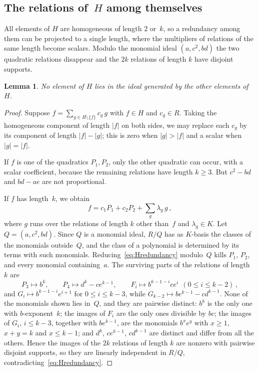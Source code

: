 \documentclass[11pt,letterpaper]{article}
\numberwithin{equation}{section}
\theoremstyle{plain}
\newtheorem{lemma}[theorem]{Lemma}
\theoremstyle{remark}
\newcommand{\len}[1]{\lvert #1\rvert}
\begin{document}
\subsection{The relations of~$H$ among themselves}

All elements of $H$ are homogeneous of length $2$ or~$k$, so a redundancy among them can be projected to a single length, where the multipliers of relations of the same length become scalars. Modulo the monomial ideal $(a,c^2,bd)$ the two quadratic relations disappear and the $2k$ relations of length $k$ have disjoint supports.

\begin{lemma}\label{lem:Hnonred}
No element of $H$ lies in the ideal generated by the other elements of~$H$.
\end{lemma}

\begin{proof}
Suppose $f=\sum_{g\in H\setminus\{f\}}c_g\,g$ with $f\in H$ and $c_g\in R$. Taking the homogeneous component of length $\len{f}$ on both sides, we may replace each $c_g$ by its component of length $\len{f}-\len{g}$; this is zero when $\len{g}>\len{f}$ and a scalar when $\len{g}=\len{f}$.

If $f$ is one of the quadratics $P_1,P_2$, only the other quadratic can occur, with a scalar coefficient, because the remaining relations have length $k\ge 3$. But $c^2-bd$ and $bd-ae$ are not proportional.

If $f$ has length~$k$, we obtain
\begin{equation}\label{eq:Hredundancy}
f=c_1P_1+c_2P_2+\sum_{g}\lambda_g\,g\,,
\end{equation}
where $g$ runs over the relations of length $k$ other than~$f$ and $\lambda_g\in K$. Let $Q=(a,c^2,bd)$. Since $Q$ is a monomial ideal, $R/Q$ has as $K$-basis the classes of the monomials outside~$Q$, and the class of a polynomial is determined by its terms with such monomials. Reducing~\eqref{eq:Hredundancy} modulo~$Q$ kills $P_1$, $P_2$, and every monomial containing~$a$. The surviving parts of the relations of length~$k$ are
\begin{equation*}
P_3\mapsto b^k,\qquad P_4\mapsto d^k-ce^{k-1},\qquad F_i\mapsto b^{k-1-i}ce^{i}\ \ (0\le i\le k-2)\,,
\end{equation*}
and $G_i\mapsto b^{k-1-i}e^{i+1}$ for $0\le i\le k-3$, while $G_{k-2}\mapsto be^{k-1}-cd^{k-1}$. None of the monomials shown lies in~$Q$, and they are pairwise distinct: $b^k$ is the only one with $b$-exponent~$k$; the images of $F_i$ are the only ones divisible by $bc$; the images of $G_i$, $i\le k-3$, together with $be^{k-1}$, are the monomials $b^{x}e^{y}$ with $x\ge 1$, $x+y=k$ and $x\le k-1$; and $d^k$, $ce^{k-1}$, $cd^{k-1}$ are distinct and differ from all the others. Hence the images of the $2k$ relations of length $k$ are nonzero with pairwise disjoint supports, so they are linearly independent in $R/Q$, contradicting~\eqref{eq:Hredundancy}.
\end{proof}
\end{document}
